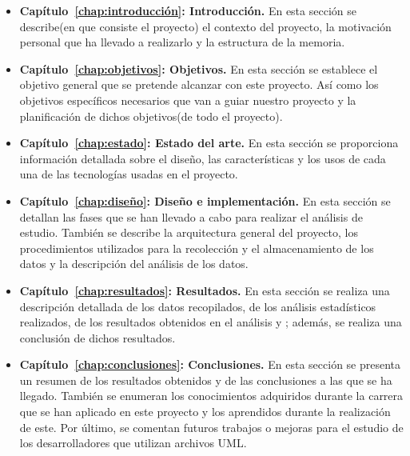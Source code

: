 \documentclass[a4paper, 12pt]{book}
\begin{document}
\begin{itemize}
  
  \item \textbf{Capítulo~\ref{chap:introducción}: Introducción.} En esta sección se describe(en que consiste el proyecto) el contexto del proyecto, la motivación personal que ha llevado a realizarlo y la estructura de la memoria. 

  \item \textbf{Capítulo~\ref{chap:objetivos}: Objetivos.} En esta sección se establece el objetivo general que se pretende alcanzar con este proyecto. 
  Así como los objetivos específicos necesarios que van a guiar nuestro proyecto y la planificación de dichos objetivos(de todo el proyecto). 
  
  \item \textbf{Capítulo~\ref{chap:estado}: Estado del arte.} En esta sección se proporciona información detallada sobre el diseño, las características y los usos de cada una de las tecnologías usadas en el proyecto.  
  
  \item \textbf{Capítulo~\ref{chap:diseño}: Diseño e implementación.} En esta sección se detallan las fases que se han llevado a cabo para realizar el análisis de estudio. 
  También se describe la arquitectura general del proyecto, los procedimientos utilizados para la recolección y el almacenamiento de los datos y la descripción del análisis de los datos.

  \item \textbf{Capítulo~\ref{chap:resultados}: Resultados.} En esta sección se realiza una descripción detallada de los datos recopilados, de los análisis estadísticos realizados, de los resultados obtenidos en el análisis y ; además, se realiza una conclusión de dichos resultados.
 
  \item \textbf{Capítulo~\ref{chap:conclusiones}: Conclusiones.} En esta sección se presenta un resumen de los resultados obtenidos y de las conclusiones a las que se ha llegado. 
  También se enumeran los conocimientos adquiridos durante la carrera que se han aplicado en este proyecto y los aprendidos durante la realización de este.
  Por último, se comentan futuros trabajos o mejoras para el estudio de los desarrolladores que utilizan archivos UML. 
  
  
\end{itemize}
\end{document}
